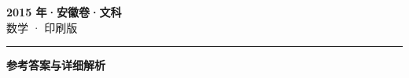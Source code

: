 \documentclass[zihao=5, a4paper]{ctexart}
\begin{document}
\begin{center}
  {\Large\bfseries 2015 年·安徽卷·文科}\\[4pt]
  {\large 数学 · 印刷版}
\end{center}
\medskip
{}

\par\bigskip\hrule\bigskip
{}
\begin{center}{\large\bfseries 参考答案与详细解析}\end{center}
\smallskip

\end{document}
